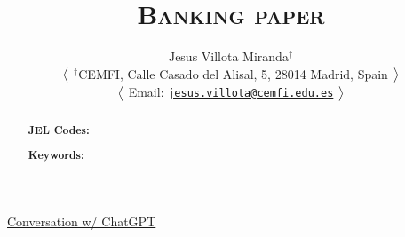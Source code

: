 \documentclass[12pt,a4paper]{article}
\title{\textsc{
{\LARGE Banking paper}
}}
\author[1]{
{ \bx \bx \bx Jesus Villota Miranda$^{\dagger}$
}

\bx 
{\small
$\big{<}$
\noindent $^{\dagger}$CEMFI, Calle Casado del Alisal, 5, 28014 Madrid, Spain 
$\big{>}$

$\big{<}$
Email: \href{jesus.villota@cemfi.edu.es}{\texttt{jesus.villota@cemfi.edu.es}}
$\big{>}$
}
}
\date{}  %
\begin{document}
\maketitle
\thispagestyle{empty}  %


\begin{abstract}
%

\bigskip
\noindent\textbf{JEL Codes:} 

\noindent\textbf{Keywords:}
\end{abstract}


\newpage
\tableofcontents
\thispagestyle{empty}  %


\newpage
\setcounter{page}{1}

%
%
%


\noindent \Vhrulefill 

{\centering \href{https://chatgpt.com/share/66fbb32c-7ec8-800d-8f5b-3ffee68c5864}{Conversation w/ ChatGPT} \par}

\noindent \Vhrulefill











%
%
%
\end{document}
